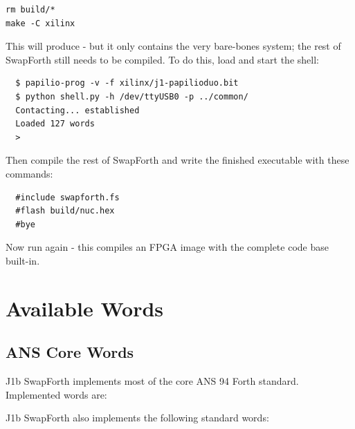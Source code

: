 \begin{Verbatim}
rm build/*
make -C xilinx
\end{Verbatim}

\noindent
This will produce  - but it only contains the very bare-bones system;
the rest of SwapForth still needs to be compiled.
To do this, load  and start the shell:

\begin{framed}
\begin{Verbatim}
  $ papilio-prog -v -f xilinx/j1-papilioduo.bit
  $ python shell.py -h /dev/ttyUSB0 -p ../common/
  Contacting... established
  Loaded 127 words
  >
\end{Verbatim}
\end{framed}

Then compile the rest of SwapForth and write the finished executable with these commands:

\begin{framed}
\begin{Verbatim}
  #include swapforth.fs
  #flash build/nuc.hex
  #bye
\end{Verbatim}
\end{framed}

Now run  again - this compiles an FPGA image with the complete code base built-in.


\chapter{Available Words}

\section{ANS Core Words} 

J1b SwapForth implements most of the core ANS 94 Forth standard.
Implemented words are:



\noindent
J1b SwapForth also implements the following standard words:

